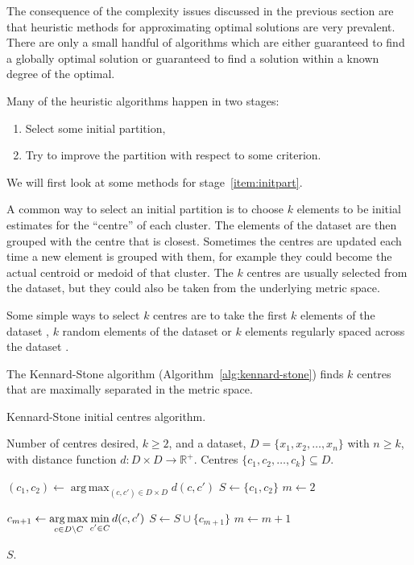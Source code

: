 \documentclass[a4paper]{report}
\DeclareMathOperator*{\argmax}{arg\,max}
\newcommand{\dset}{D}
\begin{document}
The consequence of the complexity issues discussed in the previous section are
that heuristic methods for approximating optimal solutions are very
prevalent.  There are only a small handful of algorithms which are either
guaranteed to find a globally optimal solution or guaranteed to find a
solution within a known degree of the optimal.

Many of the heuristic algorithms happen in two stages:
\begin{enumerate}
\item \label{item:initpart} Select some initial partition,
\item \label{item:improvepart} Try to improve the partition with respect to
  some criterion.
\end{enumerate}
We will first look at some methods for stage~\ref{item:initpart}.

A common way to select an initial partition is to choose $k$ elements to be
initial estimates for the ``centre'' of each cluster.  The elements of the
dataset are then grouped with the centre that is closest.  Sometimes the
centres are updated each time a new element is grouped with them, for example
they could become the actual centroid or medoid of that cluster.  The $k$
centres are usually selected from the dataset, but they could also be taken
from the underlying metric space.

Some simple ways to select $k$ centres are to take the first $k$ elements of
the dataset \citep{macqueen1967some}, $k$ random elements of the dataset
\citep{forgy65cluster} or $k$ elements regularly spaced across the dataset
\citep{beale1969euclidean}.

The Kennard-Stone algorithm (Algorithm~\ref{alg:kennard-stone}) finds $k$
centres that are maximally separated in the metric space.

\begin{algorithm}
  \caption{Kennard-Stone initial centres algorithm.}
  \label{alg:kennard-stone}

  \begin{algorithmic}
    \Require Number of centres desired, $k \geq 2$, and a dataset, $\dset =
             \{x_1,x_2,\dotsc,x_n\}$ with $n \geq k$, with distance function
             $d \colon \dset \times \dset \to \mathbb{R}^+$.
    \Ensure Centres $\{c_1,c_2,\dotsc,c_k\} \subseteq \dset$.

    \State $\displaystyle (c_1,c_2) \gets
            \argmax_{(c,c') \in \dset \times \dset} d(c,c')$
    \State $S \gets \{c_1,c_2\}$
    \State $m \gets 2$

       \State $\displaystyle c_{m+1} \gets
               \argmax_{c \in \dset \setminus C}
               \min_{\raisebox{-.2em}{$\scriptstyle c' \in C$}} d(c,c')$
       \State $S \gets S \cup \{c_{m+1}\}$
       \State $m \gets m+1$
    \EndWhile

    \State \Return $S$.
  \end{algorithmic}
\end{algorithm}
\end{document}
